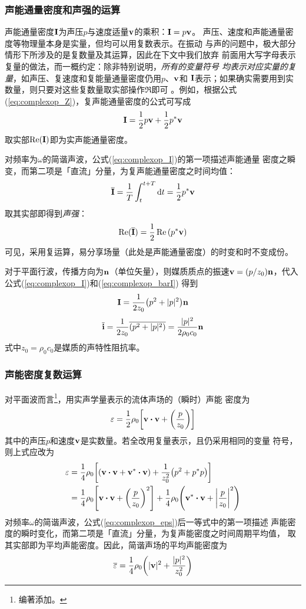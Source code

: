 \documentclass[UTF8]{ctexbook}
\begin{document}
\subsubsection{声能通量密度和声强的运算}
声能通量密度$\vb{I}$为声压$p$与速度适量$\vb{v}$的乘积：$\vb{I}=p \vb{v}$。
声压、速度和声能通量密度等物理量本身是实量，但均可以用复数表示。在振动
与声的问题中，极大部分情形下所涉及的是复数量及其运算，因此在下文中我们放弃
前面用大写字母表示复量的做法，而一概约定：除非特别说明，\emph{所有的变量符号
均表示对应实量的复量}，如声压、复速度和复能量通量密度仍用$p$、$\vb{v}$和
$\vb{I}$表示；如果确实需要用到实数量，则只要对这些复数量取实部操作$\Re$即可
。例如，根据公式(\ref{eq:complexop_Z})，复声能通量密度的公式可写成
\begin{equation}
	\label{eq:complexop_I}
	\vb{I} = \frac12 p\vb{v} + \frac12 p^* \vb{v}
\end{equation}
取实部$\Re(\vb{I})$即为实声能通量密度。

对频率为$\omega$的简谐声波，公式(\ref{eq:complexop_I})的第一项描述声能通量
密度之瞬变，而第二项是「直流」分量，为复声能通量密度之时间均值：
\begin{equation}
	\label{eq:complexop_barI}
	\overline{\vb{I}} = \frac1T \int_t^{t+T}\dd{t} = \frac12 p^* \vb{v}
\end{equation}
取其实部即得到\emph{声强}：
$$\Re(\overline{\vb{I}}) = \frac12 \Re\qty(p^* \vb{v})$$
可见，采用复运算，易分享场量（此处是声能通量密度）的时变和时不变成份。

对于平面行波，传播方向为$\vb{n}$（单位矢量），则媒质质点的振速$\vb{v}
=(p/z_0)\vb{n}$，代入公式(\ref{eq:complexop_I})和(\ref{eq:complexop_barI})
得到
$$\vb{I} = \frac{1}{2z_0}\qty(p^2+|p|^2)\vb{n}$$
$$\overline{\vb{i}} = \frac{1}{2z_0} \overline{\qty(p^2+|p|^2)}
=\frac{|p|^2}{2\rho_0 c_0 }\vb{n}$$
式中$z_0=\rho_0c_0$是媒质的声特性阻抗率。

\subsubsection{声能密度复数运算}
对平面波而言\footnote{编著添加。}，用实声学量表示的流体声场的（瞬时）声能
密度为
$$\eps = \frac12 \rho_0 \qty[\vb{v} \vdot \vb{v} +\qty(\frac{p}{z_0})]$$
其中的声压$p$和速度$\vb{v}$是实数量。若全改用复量表示，且仍采用相同的变量
符号，则上式应改为
\begin{align}
	\label{eq:complexop_eps}
	\eps & = \frac14 \rho_0 \qty[(\vb{v}\vdot\vb{v} + \vb{v}^*\vdot
	\vb{v}) +\frac{1}{z_0^2} \qty(p^2+p^* p)]\nonumber\\
	& = \frac14 \rho_0 \qty[\vb{v}\vdot\vb{v}+ \qty(\frac{p}{z_0} )^2]
	+\frac14 \rho_0 \qty(\vb{v}^*\vdot \vb{v} + \qty|\frac{p}{z_0}|^2)
\end{align}
对频率$\omega$的简谐声波，公式(\ref{eq:complexop_eps})后一等式中的第一项描述
声能密度的瞬时变化，而第二项是「直流」分量，为复声能密度之时间周期平均值，
取其实部即为平均声能密度。因此，简谐声场的平均声能密度为
\begin{equation}
	\label{eq:complexop_bareps}
	\overline{\varepsilon} = \frac14 \rho_0 \qty(|\vb{v}|^2 +\frac{|p|^2}{z_0^2})
\end{equation}
\end{document}
